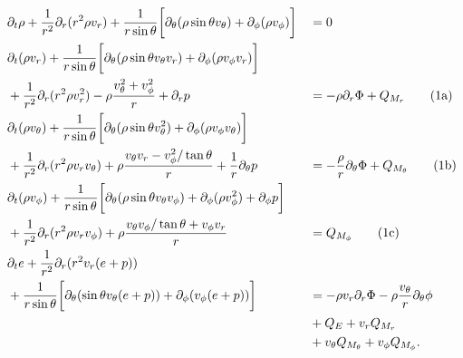 \begin{alignat}{2}
&\partial_t \rho + \frac{1}{r^2} \partial_r (r^2 \rho v_r) + \frac{1}{r \sin{\theta}} \bigg[ \partial_{\theta} (\rho \sin{\theta} v_{\theta}) +
\partial_{\phi} (\rho v_{\phi}) \bigg] &&= 0 \\
%
\stepcounter{equation}
&\partial_t (\rho v_r) + \frac{1}{r \sin{\theta}} \bigg[ \partial_{\theta} (\rho \sin{\theta} v_{\theta} v_r)
+\partial_{\phi} (\rho v_{\phi} v_r) \bigg]&&\nonumber \\ 
& + \frac{1}{r^2} \partial_r (r^2 \rho v_r^2)  - \rho \frac{v_{\theta}^2 + v_{\phi}^2}{r} + \partial_r p 
&&= - \rho \partial_r \Phi + Q_{M_r} \tag{\theequation{}a} \\
%
&\partial_t (\rho v_{\theta}) + \frac{1}{r \sin{\theta}}\bigg[ \partial_{\theta} (\rho \sin{\theta} v_{\theta}^2) +
\partial_{\phi} (\rho v_{\phi} v_{\theta}) \bigg] &&\nonumber \\  
& + \frac{1}{r^2} \partial_r (r^2 \rho v_r v_{\theta})
+\rho \frac{v_{\theta}v_r - v_{\phi}^2/\tan{\theta}}{r} + \frac{1}{r}\partial_{\theta} p 
&&= - \frac{\rho}{r} \partial_{\theta} \Phi + Q_{M_{\theta}} \tag{\theequation{}b} \\
%
&\partial_t (\rho v_{\phi})  
+\frac{1}{r \sin{\theta}} \bigg[ \partial_{\theta} (\rho \sin{\theta} v_{\theta} v_{\phi}) +
\partial_{\phi} (\rho v_{\phi}^2)  + \partial_{\phi} p  \bigg] &&\nonumber \\
&+ \frac{1}{r^2} \partial_r (r^2 \rho v_r v_{\phi}) +
\rho \frac{v_{\theta}v_{\phi}/\tan{\theta} + v_{\phi}v_r}{r}
&& = Q_{M_{\phi}} \tag{\theequation{}c} \\
%
&\partial_t e + \frac{1}{r^2} \partial_r (r^2 v_r (e + p)) && \nonumber \\
& +\frac{1}{r \sin{\theta}} \bigg[ \partial_{\theta} ( \sin{\theta} v_{\theta} (e + p))  +
 \partial_{\phi} (v_{\phi} (e + p)) \bigg] &&= -\rho v_r \partial_r \Phi - \rho\frac{v_{\theta}}{r}\partial_{\theta}\phi \nonumber \\
& && + Q_E + v_r Q_{M_r} \nonumber \\
& && + v_{\theta} Q_{M_{\theta}} + v_{\phi} Q_{M_{\phi}}.
\end{alignat}















